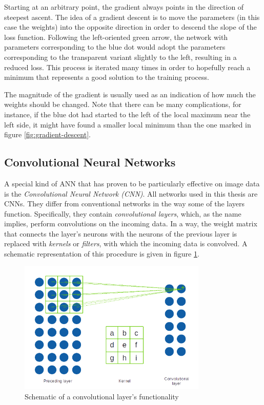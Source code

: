 \documentclass[11pt, a4paper]{article}
\begin{document}
Starting at an arbitrary point, the gradient always points in the direction of steepest ascent. The idea of a gradient descent is to move the parameters (in this case the weights) into the opposite direction in order to descend the slope of the loss function. Following the left-oriented green arrow, the network with parameters corresponding to the blue dot would adopt the parameters corresponding to the transparent variant slightly to the left, resulting in a reduced loss. This process is iterated many times in order to hopefully reach a minimum that represents a good solution to the training process.

The magnitude of the gradient is usually used as an indication of how much the weights should be changed. Note that there can be many complications, for instance, if the blue dot had started to the left of the local maximum near the left side, it might have found a smaller local minimum than the one marked in figure \ref{fig:gradient-descent}.











\subsection{Convolutional Neural Networks}
A special kind of ANN that has proven to be particularly effective on image data is the \emph{Convolutional Neural Network (CNN)}. All networks used in this thesis are CNNs. They differ from conventional networks in the way some of the layers function. Specifically, they contain \emph{convolutional layers}, which, as the name implies, perform convolutions on the incoming data. In a way, the weight matrix that connects the layer's neurons with the neurons of the previous layer is replaced with \emph{kernels} or \emph{filters}, with which the incoming data is convolved. A schematic representation of this procedure is given in figure \ref{fig:convolutional-layer}.

\begin{figure}[h!tb]
	\centering
	\includegraphics[width=0.8\textwidth]{images/convolution_layer.png}
	\caption[Functionality of convolutional layers]{Schematic of a convolutional layer's functionality}
	\label{fig:convolutional-layer}
\end{figure}
\end{document}
